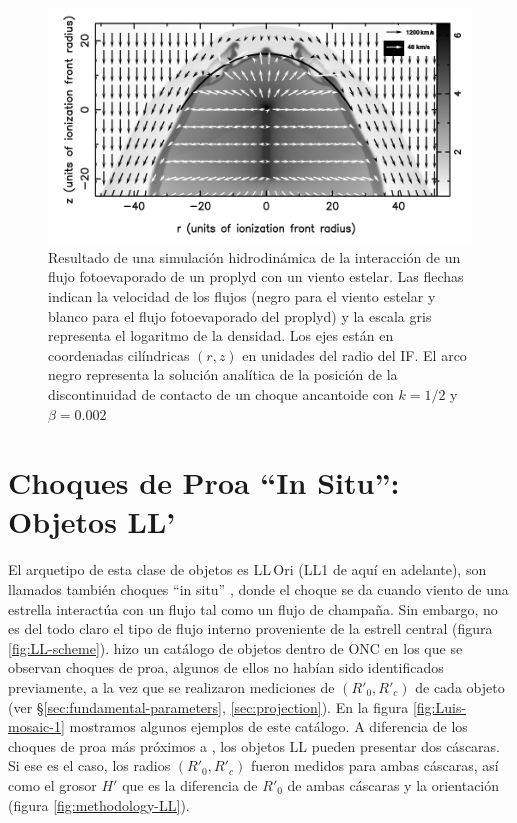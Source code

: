 \begin{figure}
  \centering
  \includegraphics[width=0.7\linewidth]{./Figures/GA-simulation}
  \caption{Resultado de una simulación hidrodinámica de la interacción de un flujo fotoevaporado de un proplyd con un viento estelar. Las flechas indican la velocidad de los flujos (negro para el viento estelar y blanco para el flujo fotoevaporado del proplyd) y la escala gris representa el logaritmo de la densidad. Los ejes están en coordenadas cilíndricas $(r, z)$ en unidades del radio del IF. El arco negro representa la solución analítica de la posición de la discontinuidad de contacto de un choque ancantoide con $k=1/2$ y $\beta=0.002$ \citep{Garcia-Arredondo:2001}}
  \label{fig:GA-simulation}
\end{figure}

\section[Objetos LL]{Choques de Proa ``In Situ'': Objetos LL'}
\label{sec:Luis-LL}

El arquetipo de esta clase de objetos es LL\,Ori (LL1 de aquí en adelante), son llamados también choques ``in situ'' \citep{Kobulnicky:2016}, donde el choque se da cuando viento de una estrella interactúa con un flujo tal como un flujo de champaña. Sin embargo, no es del todo claro el tipo de flujo interno proveniente de la estrell central (figura \ref{fig:LL-scheme}). \citet{Gutierrez-Soto:2015a} hizo un catálogo de objetos dentro de ONC en los que se observan choques de proa, algunos de ellos no habían sido identificados previamente, a la vez que se realizaron mediciones de $(R'_0, R'_c)$ de cada objeto (ver \S \ref{sec:fundamental-parameters}, \ref{sec:projection}). En la figura \ref{fig:Luis-mosaic-1} mostramos algunos ejemplos de este catálogo. A diferencia de los choques de proa más próximos a \thC{}, los objetos LL pueden presentar dos cáscaras. Si ese es el caso, los radios $(R'_0, R'_c)$ fueron medidos para ambas cáscaras, así como el grosor $H'$ que es la diferencia de $R'_0$ de ambas cáscaras y la orientación (figura \ref{fig:methodology-LL}).

